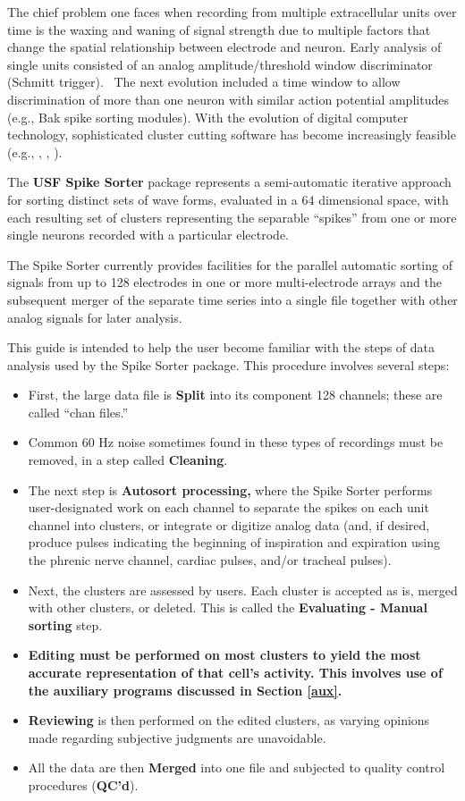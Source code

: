 \documentclass[12pt]{article}
\begin{document}
The chief problem one faces when recording from multiple extracellular
units over time is the waxing and waning of signal strength due to
multiple factors that change the spatial relationship between
electrode and neuron. Early analysis of single units consisted of an
analog amplitude/threshold window discriminator (Schmitt trigger). \
The next evolution included a time window to allow discrimination of
more than one neuron with similar action potential amplitudes (e.g.,
Bak spike sorting modules). With the evolution of digital computer
technology, sophisticated cluster cutting software has become
increasingly feasible (e.g., \cite{fee1996automatic},
\cite{lewicki1998review}, \cite{gerstein1964simultaneous}).

The \textbf{USF Spike Sorter} package represents a semi-automatic
iterative approach for sorting distinct sets of wave forms, evaluated
in a 64 dimensional space, with each resulting set of clusters
representing the separable ``spikes'' from one or more single neurons
recorded with a particular electrode.

The Spike Sorter currently provides facilities for the parallel
automatic sorting of signals from up to 128 electrodes in one or more
multi-electrode arrays and the subsequent merger of the separate time
series into a single file together with other analog signals for later
analysis.

This guide is intended to help the user become familiar with the steps
of data analysis used by the Spike Sorter package. This procedure
involves several steps:
\begin{itemize}
\item First, the large data file is \textbf{Split} into its component
  128 channels; these are called ``chan files.''
\item Common 60 Hz noise sometimes found in these types of recordings
  must be removed, in a step called \textbf{Cleaning}.
\item The next step is \textbf{Autosort processing,} where the Spike
  Sorter performs user-designated work on each channel to separate the
  spikes on each unit channel into clusters, or integrate or digitize
  analog data (and, if desired, produce pulses indicating the
  beginning of inspiration and expiration using the phrenic nerve
  channel, cardiac pulses, and/or tracheal pulses).
\item Next, the clusters are assessed by users. Each cluster is
  accepted as is, merged with other clusters, or deleted. This is
  called the \textbf{Evaluating - Manual sorting} step.
\item {\bfseries Editing\textmd{ must be performed on most clusters to
      yield the most accurate representation of that cell's activity.
      This involves use of the auxiliary programs discussed in Section
      \ref{aux}.}}
\item \textbf{Reviewing} is then performed on the edited clusters, as
  varying opinions made regarding subjective judgments are
  unavoidable.
\item All the data are then \textbf{Merged} into one file and
  subjected to quality control procedures (\textbf{QC'd}).
\end{itemize}
\end{document}
